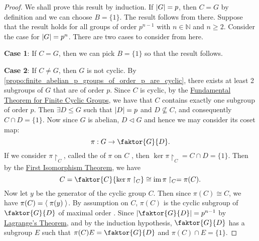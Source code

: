 \begin{proof}
  We shall prove this result by induction. If $\left|G\right| = p$, then $C = G$ by definition and we can choose $B = \{1\}$. The result follows from there. Suppose that the result holds for all groups of order $p^{n - 1}$ with $n \in \mathbb{N}$ and $n \geq 2$. Consider the case for $\left|G\right| = p^n$. There are two cases to consider from here.

  \noindent \textbf{Case 1}: If $C = G$, then we can pick $B = \{1\}$ so that the result follows.

  \noindent \textbf{Case 2}: If $C \neq G$, then $G$ is not cyclic. By \cref{propo:finite_abelian_p_groups_of_order_p_are_cyclic}, there exists at least 2 subgroups of $G$ that are of order $p$. Since $C$ is cyclic, by the \hyperref[thm:fundamental_theorem_of_finite_cyclic_groups]{Fundamental Theorem for Finite Cyclic Groups}, we have that $C$ contains exactly one subgroup of order $p$. Then $\exists D \leq G$ such that $\left|D\right| = p$ and $D \not\subseteq C$, and consequently $C \cap D = \{1\}$. Now since $G$ is abelian, $D \triangleleft G$ and hence we may consider its coset map:
  \begin{equation*}
    \pi : G \to \faktor{G}{D}.
  \end{equation*}
  If we consider $\pi \restriction_C$, called the  of $\pi$ on $C$ , then $\ker \pi \restriction_C = C \cap D = \{1\}$. Then by the \hyperref[thm:first_isomorphism_theorem]{First Isomorphism Theorem}, we have
  \begin{equation*}
    C = \faktor{C}{\ker \pi \restriction_C} \cong \img \pi \restriction_C = \pi(C).
  \end{equation*}
  Now let $y$ be the generator of the cyclic group $C$. Then since $\pi(C) \cong C$, we have $\pi(C) = \langle \;  \pi(y)  \; \rangle$. By assumption on $C$, $\pi(C)$ is the cyclic subgroup of $\faktor{G}{D}$ of maximal order . Since $\abs{ \faktor{G}{D} } = p^{n - 1}$ by\\
  \noindent \hyperref[thm:lagrange_s_theorem]{Lagrange's Theorem}, and by the induction hypothesis, $\faktor{G}{D}$ has a subgroup $E$ such that $\pi(C) E = \faktor{G}{D}$ and $\pi(C) \cap E = \{1\}$.


\end{proof}
